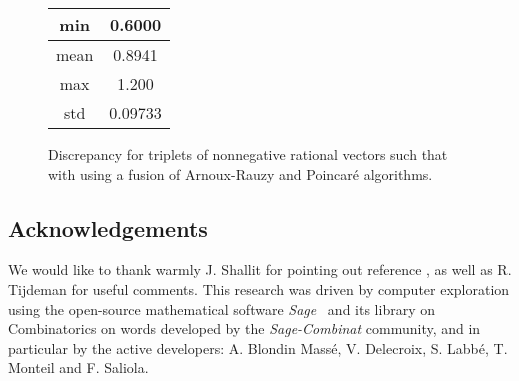 \documentclass[preliminary,copyright,creativecommons]{eptcs}
\begin{document}
\begin{center}
\begin{figure}[ht!]
\begin{minipage}[c]{0.2\linewidth}
\begin{tabular}{c|c}
min & 0.6000 \\
\hline
mean & 0.8941 \\
\hline
max & 1.200 \\
\hline
std & 0.09733 \\
\end{tabular}
 \end{minipage}
\begin{minipage}[c]{0.8\linewidth}
\end{minipage}
 \caption{Discrepancy for triplets of nonnegative rational  vectors    such that  with  using a fusion of  Arnoux-Rauzy and Poincar\'e algorithms.}
\label{fig:PAR}
\end{figure}
\end{center}







\newpage
\subsection*{Acknowledgements}
We  would  like to thank  warmly J. Shallit for  pointing  out    reference \cite{tij}, as well as R. Tijdeman for useful comments.
This research was driven by computer exploration using the open-source
mathematical software \emph{Sage}~\cite{sage} and its library on Combinatorics on words developed by the \emph{Sage-Combinat}
community, and in particular by the active developers:  A. Blondin Mass\'e, V. Delecroix, S. Labb\'e, T. Monteil and  F. Saliola.

\nocite{*}


\end{document}
